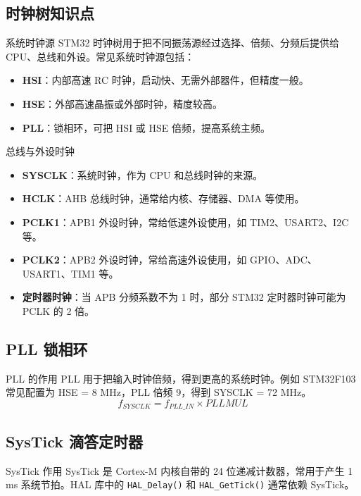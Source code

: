 \documentclass[UTF8,fontset=none,12pt]{ctexart}
\newcommand{\api}[1]{{\footnotesize\nolinkurl{#1}}}
\begin{document}
\subsection{时钟树知识点}
\begin{pointbox}{系统时钟源}
STM32 时钟树用于把不同振荡源经过选择、倍频、分频后提供给 CPU、总线和外设。常见系统时钟源包括：
\begin{itemize}
  \item \textbf{HSI}：内部高速 RC 时钟，启动快、无需外部器件，但精度一般。
  \item \textbf{HSE}：外部高速晶振或外部时钟，精度较高。
  \item \textbf{PLL}：锁相环，可把 HSI 或 HSE 倍频，提高系统主频。
\end{itemize}
\end{pointbox}

\begin{pointbox}{总线与外设时钟}
\begin{itemize}
  \item \textbf{SYSCLK}：系统时钟，作为 CPU 和总线时钟的来源。
  \item \textbf{HCLK}：AHB 总线时钟，通常给内核、存储器、DMA 等使用。
  \item \textbf{PCLK1}：APB1 外设时钟，常给低速外设使用，如 TIM2、USART2、I2C 等。
  \item \textbf{PCLK2}：APB2 外设时钟，常给高速外设使用，如 GPIO、ADC、USART1、TIM1 等。
  \item \textbf{定时器时钟}：当 APB 分频系数不为 1 时，部分 STM32 定时器时钟可能为 PCLK 的 2 倍。
\end{itemize}
\end{pointbox}

\subsection{PLL 锁相环}
\begin{pointbox}{PLL 的作用}
PLL 用于把输入时钟倍频，得到更高的系统时钟。例如 STM32F103 常见配置为 HSE = 8 MHz，PLL 倍频 9，得到 SYSCLK = 72 MHz。
\[
  f_{SYSCLK}=f_{PLL\_IN}\times PLLMUL
\]
\end{pointbox}

\subsection{SysTick 滴答定时器}
\begin{pointbox}{SysTick 作用}
SysTick 是 Cortex-M 内核自带的 24 位递减计数器，常用于产生 1 ms 系统节拍。HAL 库中的 \api{HAL_Delay()} 和 \api{HAL_GetTick()} 通常依赖 SysTick。
\end{pointbox}
\end{document}

